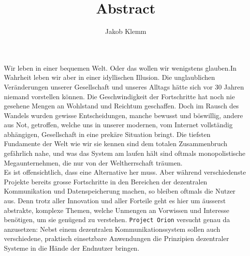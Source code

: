 \documentclass[11pt]{article}
\author{Jakob Klemm}
\date{}
\title{Abstract}
\begin{document}
\noindent Wir leben in einer bequemen Welt. Oder das wollen wir
wenigstens glauben.In Wahrheit leben wir aber in einer idyllischen
Illusion. Die unglaublichen Veränderungen unserer Gesellschaft und
unseres Alltags hätte sich vor 30 Jahren niemand vorstellen können.
Die Geschwindigkeit der Fortschritte hat noch nie gesehene Mengen an
Wohlstand und Reichtum geschaffen. Doch im Rausch des Wandels wurden
gewisse Entscheidungen, manche bewusst und böswillig, andere aus Not,
getroffen, welche uns in unserer modernen, vom Internet vollständig
abhängigen, Gesellschaft in eine prekäre Situation bringt. Die
tiefsten Fundamente der Welt wie wir sie kennen sind dem totalen
Zusammenbruch gefährlich nahe, und was das System am laufen hält sind
oftmals monopolistische Megaunternehmen, die nur von der
Weltherrschaft träumen.\\

\noindent Es ist offensichtlich, dass eine Alternative her muss. Aber
während verschiedenste Projekte bereits grosse Fortschritte in den
Bereichen der dezentralen Kommunikation und Datenspeicherung machen,
so bleiben oftmals die Nutzer aus. Denn trotz aller Innovation und
aller Forteile geht es hier um äusserst abstrakte, komplexe Themen,
welche Unmengen an Vorwissen und Interesse benötigen, um sie genügend
zu verstehen. \texttt{Project Orion} versucht genau da anzusetzen: Nebst einem
dezentralen Kommunikationssystem sollen auch verschiedene, praktisch
einsetzbare Anwendungen die Prinzipien dezentraler Systeme in die
Hände der Endnutzer bringen. 
\end{document}
